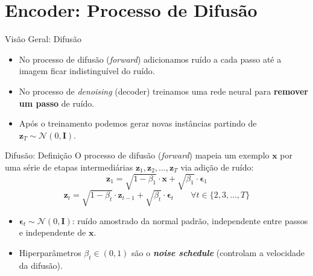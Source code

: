\documentclass[aspectratio=169,xcolor=dvipsnames]{beamer}
\begin{document}
  \section{Encoder: Processo de Difusão}

  \begin{frame}{Visão Geral: Difusão}
    \begin{itemize}
      \item No processo de difusão (\textit{forward}) adicionamos ruído
      a cada passo até a imagem ficar indistinguível do ruído.
      \item No processo de \textit{denoising} (decoder) treinamos uma
      rede neural para \textbf{remover um passo} de ruído.
      \item Após o treinamento podemos gerar novas instâncias partindo
      de $\mathbf{z}_T \sim \mathcal{N}(0,\mathbf{I})$.
    \end{itemize}
  \end{frame}



  \begin{frame}{Difusão: Definição}
    O processo de difusão (\textit{forward}) mapeia um exemplo $\mathbf{x}$ por
    uma série de etapas intermediárias $\mathbf{z}_1, \mathbf{z}_2, \ldots, \mathbf{z}_T$ via
    adição de ruído:
    \vspace{0.3em}
    \[
      \mathbf{z}_1 = \sqrt{1 - \beta_1}\cdot \mathbf{x} + \sqrt{\beta_1}\cdot \boldsymbol{\epsilon}_1
    \]
    \[
      \mathbf{z}_t = \sqrt{1 - \beta_t}\cdot \mathbf{z}_{t-1} + \sqrt{\beta_t}\cdot \boldsymbol{\epsilon}_t
      \qquad \forall t \in \{2, 3, \ldots, T\}
    \]
    \vspace{0.2em}
    \begin{itemize}
      \item $\boldsymbol{\epsilon}_t \sim \mathcal{N}(0,\mathbf{I})$: ruído amostrado
      da normal padrão, independente entre passos e independente de $\mathbf{x}$.
      \item Hiperparâmetros $\beta_t \in (0,1)$ são o
      \textbf{\textit{noise schedule}} (controlam a velocidade da
      difusão).
    \end{itemize}
  \end{frame}
\end{document}
